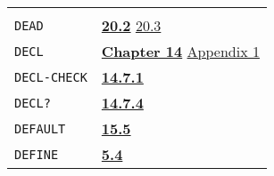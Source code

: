\documentclass[a4paper]{scrbook}
\begin{document}
\begin{longtable}[]{@{}ll@{}}
\begin{minipage}[t]{0.70\columnwidth}
\strut
\end{minipage}\tabularnewline
\begin{minipage}[t]{0.24\columnwidth}\raggedright\strut
\texttt{DEAD}\strut
\end{minipage} & \begin{minipage}[t]{0.70\columnwidth}\raggedright\strut
\textbf{\href{20-coroutines.md\#202-state-of-a-process}{20.2}} \href{20-coroutines.md\#203-process-the-subr}{20.3}\strut
\end{minipage}\tabularnewline
\begin{minipage}[t]{0.24\columnwidth}\raggedright\strut
\texttt{DECL}\strut
\end{minipage} & \begin{minipage}[t]{0.70\columnwidth}\raggedright\strut
\textbf{\href{14-data-type-declarations.md\#chapter-14-data-type-declarations}{Chapter 14}}
\href{appendix-1-a-look-inside.md\#variable-bindings}{Appendix 1}\strut
\end{minipage}\tabularnewline
\begin{minipage}[t]{0.24\columnwidth}\raggedright\strut
\texttt{DECL-CHECK}\strut
\end{minipage} & \begin{minipage}[t]{0.70\columnwidth}\raggedright\strut
\textbf{\href{14-data-type-declarations.md\#1471-decl-check}{14.7.1}}\strut
\end{minipage}\tabularnewline
\begin{minipage}[t]{0.24\columnwidth}\raggedright\strut
\texttt{DECL?}\strut
\end{minipage} & \begin{minipage}[t]{0.70\columnwidth}\raggedright\strut
\textbf{\href{14-data-type-declarations.md\#1474-decl}{14.7.4}}\strut
\end{minipage}\tabularnewline
\begin{minipage}[t]{0.24\columnwidth}\raggedright\strut
\texttt{DEFAULT}\strut
\end{minipage} & \begin{minipage}[t]{0.70\columnwidth}\raggedright\strut
\textbf{\href{15-lexical-blocking.md\#155-initial-state}{15.5}}\strut
\end{minipage}\tabularnewline
\begin{minipage}[t]{0.24\columnwidth}\raggedright\strut
\texttt{DEFINE}\strut
\end{minipage} & \begin{minipage}[t]{0.70\columnwidth}\raggedright\strut
\textbf{\href{05-simple-functions.md\#54-defining-functions-function-and-define-1}{5.4}}

\end{minipage}
\end{longtable}
\end{document}
